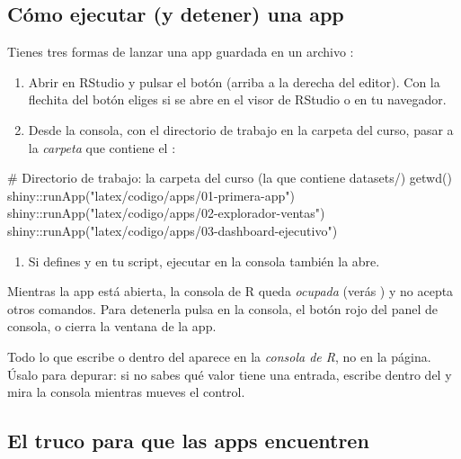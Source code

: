 \subsection{Cómo ejecutar (y detener) una app}
\label{sec:m6-ejecutar}

Tienes tres formas de lanzar una app guardada en un archivo :

\begin{enumerate}
  \item Abrir  en RStudio y pulsar el botón
         (arriba a la derecha del editor). Con la flechita del
        botón eliges si se abre en el visor de RStudio o en tu navegador.
  \item Desde la consola, con el directorio de trabajo en la carpeta del
        curso, pasar a  la \emph{carpeta} que contiene el
        :
\end{enumerate}

\begin{rnoejecutar}
# Directorio de trabajo: la carpeta del curso (la que contiene datasets/)
getwd()
shiny::runApp("latex/codigo/apps/01-primera-app")
shiny::runApp("latex/codigo/apps/02-explorador-ventas")
shiny::runApp("latex/codigo/apps/03-dashboard-ejecutivo")
\end{rnoejecutar}

\begin{enumerate}[start=3]
  \item Si defines  y  en tu script, ejecutar
         en la consola también la abre.
\end{enumerate}

Mientras la app está abierta, la consola de R queda \emph{ocupada} (verás
 ) y no acepta otros comandos. Para
detenerla pulsa  en la consola, el botón rojo  del
panel de consola, o cierra la ventana de la app.

\begin{advertencia}
Todo lo que escribe  o  dentro del
 aparece en la \emph{consola de R}, no en la página. Úsalo
para depurar: si no sabes qué valor tiene una entrada, escribe
 dentro del  y mira la
consola mientras mueves el control.
\end{advertencia}

\subsection{El truco para que las apps encuentren \texorpdfstring{}{datasets/}}
\label{sec:m6-rutas}

